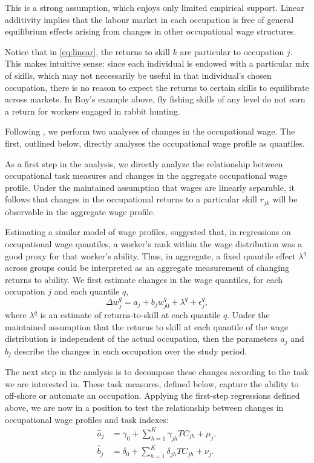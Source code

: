 This is a strong assumption, which enjoys only limited empirical support. Linear additivity implies that the labour market in each occupation is free of general equilibrium effects arising from changes in other occupational wage structures.

Notice that in \eqref{eq:linear}, the returns to skill $k$ are particular to occupation $j$. This makes intuitive sense: since each individual is endowed with a particular mix of skills, which may not necessarily be useful in that individual's chosen occupation, there is no reason to expect the returns to certain skills to equilibrate across markets. In Roy's example above, fly fishing skills of any level do not earn a return for workers engaged in rabbit hunting. %

Following \citet{Firpo2011}, we perform two analyses of changes in the occupational wage. The first, outlined below, directly analyses the occupational wage profile as quantiles.

As a first step in the analysis, we directly analyze the relationship between occupational task measures and changes in the aggregate occupational wage profile. Under the maintained assumption that wages are linearly separable, it follows that changes in the occupational returns to a particular skill $r_{jk}$ will be observable in the aggregate wage profile.

Estimating a similar model of wage profiles, \citet{Juhn1993} suggested that, in regressions on occupational wage quantiles, a worker's rank within the wage distribution was a good proxy for that worker's ability. Thus, in aggregate, a fixed quantile effect $\lambda^q$ across groups could be interpreted as an aggregate measurement of changing returns to ability. We first estimate changes in the wage quantiles, for each occupation $j$ and each quantile $q$,
\begin{equation} 
  \Delta w_j^q = a_j + b_jw_{j0}^q + \lambda^q + \epsilon^q_j, \label{eq:quantiles}
\end{equation}
where $\lambda^q$ is an estimate of returns-to-skill at each quantile $q$. Under the maintained assumption that the returns to skill at each quantile of the wage distribution is independent of the actual occupation, then the parameters $a_j$ and $b_j$ describe the changes in each occupation over the study period.

The next step in the analysis is to decompose these changes according to the task we are interested in. These task measures, defined below, capture the ability to off-shore or automate an occupation. Applying the first-step regressions defined above, we are now in a position to test the relationship between changes in occupational wage profiles and task indexes:
\begin{align}
  \hat{a}_j &= \gamma_0 + \sum_{h=1}^K\gamma_{jh}TC_{jh} + \mu_j, \label{eq:aeq} \\
  \hat{b}_j &= \delta_0 + \sum_{h=1}^K\delta_{jh}TC_{jh} + \nu_j. \label{eq:beq}
\end{align}

